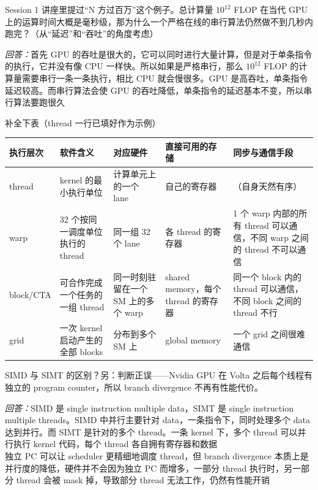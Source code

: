 \documentclass[11pt,a4paper,fontset=none]{ctexart}
\begin{document}
Session 1 讲座里提过“N 方过百万”这个例子。总计算量 $10^{12}$ FLOP 在当代 GPU 上的运算时间大概是毫秒级，那为什么一个严格在线的串行算法仍然做不到几秒内跑完？（从“延迟”和“吞吐”的角度考虑）
\par\noindent\textit{回答：}首先 GPU 的吞吐是很大的，它可以同时进行大量计算，但是对于单条指令的执行，它并没有像 CPU 一样快。所以如果是严格串行，那么 $10^{12}$ FLOP 的计算量需要串行一条一条执行，相比 CPU 就会慢很多。GPU 是高吞吐，单条指令延迟较高。而串行算法会使 GPU 的吞吐降低，单条指令的延迟基本不变，所以串行算法要跑很久

补全下表（thread 一行已填好作为示例）

\begin{center}\small
\begin{tabular}{@{}p{5.2em}p{9em}p{7.5em}p{7.5em}p{8em}@{}}
\toprule
执行层次 & 软件含义 & 对应硬件 & 直接可用的存储 & 同步与通信手段 \\
\midrule
thread & kernel 的最小执行单位 & 计算单元上的一个 lane & 自己的寄存器 & （自身天然有序） \\
warp & 32 个按同一调度单位执行的 thread & 同一组 32 个 lane & 各 thread 的寄存器 & 1 个 warp 内部的所有 thread 可以通信，不同 warp 之间的 thread 不可以通信 \\
block/CTA & 可合作完成一个任务的一组 thread & 同一时刻驻留在一个 SM 上的多个 warp & shared memory，每个 thread 的寄存器 & 同一个 block 内的 thread 可以通信，不同 block 之间的 thread 不行 \\
grid & 一次 kernel 启动产生的全部 blocks & 分布到多个 SM 上 & global memory & 一个 grid 之间很难通信 \\
\bottomrule
\end{tabular}
\end{center}

SIMD 与 SIMT 的区别？另：判断正误——Nvidia GPU 在 Volta 之后每个线程有独立的 program counter，所以 branch divergence 不再有性能代价。
\par\noindent\textit{回答：}SIMD 是 single instruction multiple data，SIMT 是 single instruction multiple threads。SIMD 中并行主要针对 data，一条指令下，同时处理多个 data 达到并行。而 SIMT 是针对的多个 thread。一条 kernel 下，多个 thread 可以并行执行 kernel 代码，每个 thread 各自拥有寄存器和数据 \\
独立 PC 可以让 scheduler 更精细地调度 thread，但 branch divergence 本质上是并行度的降低，硬件并不会因为独立 PC 而增多，一部分 thread 执行时，另一部分 thread 会被 mask 掉，导致部分 thread 无法工作，仍然有性能开销
\end{document}
